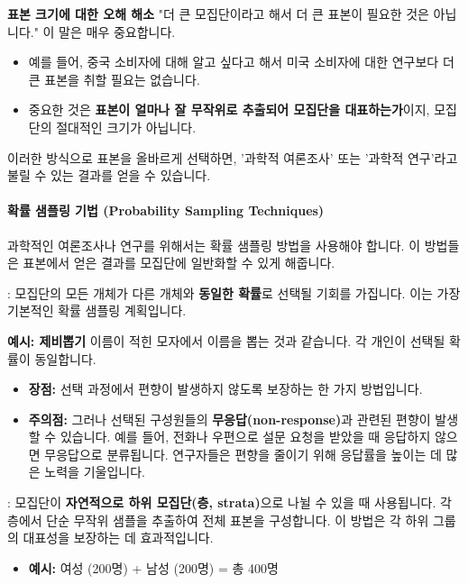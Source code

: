 \documentclass[11pt,a4paper]{article}
\begin{document}
\begin{examplebox}
\textbf{표본 크기에 대한 오해 해소}
"더 큰 모집단이라고 해서 더 큰 표본이 필요한 것은 아닙니다." 이 말은 매우 중요합니다.
\begin{itemize}
    \item 예를 들어, 중국 소비자에 대해 알고 싶다고 해서 미국 소비자에 대한 연구보다 더 큰 표본을 취할 필요는 없습니다.
    \item 중요한 것은 \textbf{표본이 얼마나 잘 무작위로 추출되어 모집단을 대표하는가}이지, 모집단의 절대적인 크기가 아닙니다.
\end{itemize}
이러한 방식으로 표본을 올바르게 선택하면, '과학적 여론조사' 또는 '과학적 연구'라고 불릴 수 있는 결과를 얻을 수 있습니다.
\end{examplebox}

\paragraph{확률 샘플링 기법 (Probability Sampling Techniques)}
과학적인 여론조사나 연구를 위해서는 확률 샘플링 방법을 사용해야 합니다. 이 방법들은 표본에서 얻은 결과를 모집단에 일반화할 수 있게 해줍니다.

\begin{tcolorbox}[mybox, title={확률 샘플링 기법 (1/3): 단순 무작위 샘플링 (Simple Random Sampling)}]
: 모집단의 모든 개체가 다른 개체와 \textbf{동일한 확률}로 선택될 기회를 가집니다. 이는 가장 기본적인 확률 샘플링 계획입니다.
\end{tcolorbox}

\begin{examplebox}
\textbf{예시: 제비뽑기}
이름이 적힌 모자에서 이름을 뽑는 것과 같습니다. 각 개인이 선택될 확률이 동일합니다.
\begin{itemize}
    \item \textbf{장점:} 선택 과정에서 편향이 발생하지 않도록 보장하는 한 가지 방법입니다.
    \item \textbf{주의점:} 그러나 선택된 구성원들의 \textbf{무응답(non-response)}과 관련된 편향이 발생할 수 있습니다. 예를 들어, 전화나 우편으로 설문 요청을 받았을 때 응답하지 않으면 무응답으로 분류됩니다. 연구자들은 편향을 줄이기 위해 응답률을 높이는 데 많은 노력을 기울입니다.
\end{itemize}
\end{examplebox}

\begin{tcolorbox}[mybox, title={확률 샘플링 기법 (2/3): 층화 샘플링 (Stratified Sampling)}]
: 모집단이 \textbf{자연적으로 하위 모집단(층, strata)}으로 나뉠 수 있을 때 사용됩니다. 각 층에서 단순 무작위 샘플을 추출하여 전체 표본을 구성합니다. 이 방법은 각 하위 그룹의 대표성을 보장하는 데 효과적입니다.
\begin{itemize}
    \item \textbf{예시:} 여성 (200명) + 남성 (200명) = 총 400명
\end{itemize}
\end{tcolorbox}
\end{document}
